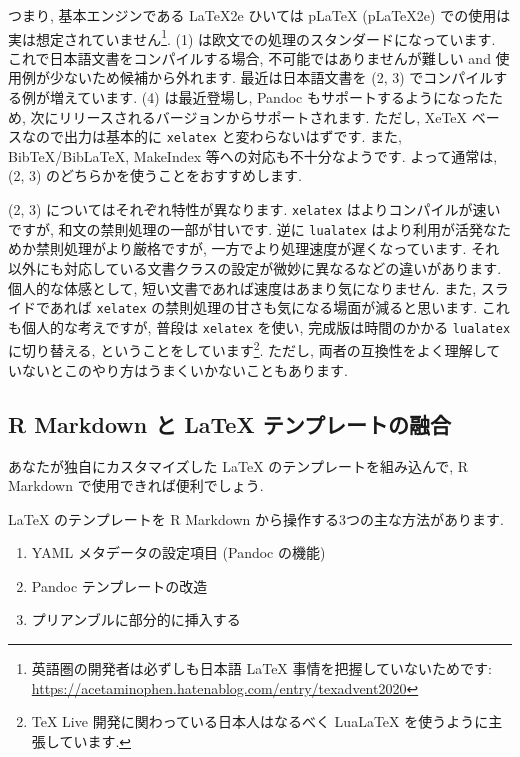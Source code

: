 \documentclass[
]{ltjsarticle}
\providecommand{\tightlist}{%
  \setlength{\itemsep}{0pt}\setlength{\parskip}{0pt}}
\begin{document}
つまり, 基本エンジンである LaTeX2e ひいては pLaTeX (pLaTeX2e) での使用は実は想定されていません\footnote{英語圏の開発者は必ずしも日本語 LaTeX 事情を把握していないためです: \url{https://acetaminophen.hatenablog.com/entry/texadvent2020}}. (1) は欧文での処理のスタンダードになっています. これで日本語文書をコンパイルする場合, 不可能ではありませんが難しい and 使用例が少ないため候補から外れます. 最近は日本語文書を (2, 3) でコンパイルする例が増えています. (4) は最近登場し, Pandoc もサポートするようになったため, 次にリリースされるバージョンからサポートされます. ただし, XeTeX ベースなので出力は基本的に \texttt{xelatex} と変わらないはずです. また, BibTeX/BibLaTeX, MakeIndex 等への対応も不十分なようです. よって通常は, (2, 3) のどちらかを使うことをおすすめします.

(2, 3) についてはそれぞれ特性が異なります. \texttt{xelatex} はよりコンパイルが速いですが, 和文の禁則処理の一部が甘いです. 逆に \texttt{lualatex} はより利用が活発なためか禁則処理がより厳格ですが, 一方でより処理速度が遅くなっています. それ以外にも対応している文書クラスの設定が微妙に異なるなどの違いがあります. 個人的な体感として, 短い文書であれば速度はあまり気になりません. また, スライドであれば \texttt{xelatex} の禁則処理の甘さも気になる場面が減ると思います. これも個人的な考えですが, 普段は \texttt{xelatex} を使い, 完成版は時間のかかる \texttt{lualatex} に切り替える, ということをしています\footnote{TeX Live 開発に関わっている日本人はなるべく LuaLaTeX を使うように主張しています.}. ただし, 両者の互換性をよく理解していないとこのやり方はうまくいかないこともあります.

\hypertarget{r-markdown-ux3068-latex-ux30c6ux30f3ux30d7ux30ecux30fcux30c8ux306eux878dux5408}{%
\subsection{R Markdown と LaTeX テンプレートの融合}\label{r-markdown-ux3068-latex-ux30c6ux30f3ux30d7ux30ecux30fcux30c8ux306eux878dux5408}}

あなたが独自にカスタマイズした LaTeX のテンプレートを組み込んで, R Markdown で使用できれば便利でしょう.

LaTeX のテンプレートを R Markdown から操作する3つの主な方法があります.

\begin{enumerate}
\def\labelenumi{\arabic{enumi}.}
\tightlist
\item
  YAML メタデータの設定項目 (Pandoc の機能)
\item
  Pandoc テンプレートの改造
\item
  プリアンブルに部分的に挿入する
\end{enumerate}
\end{document}
